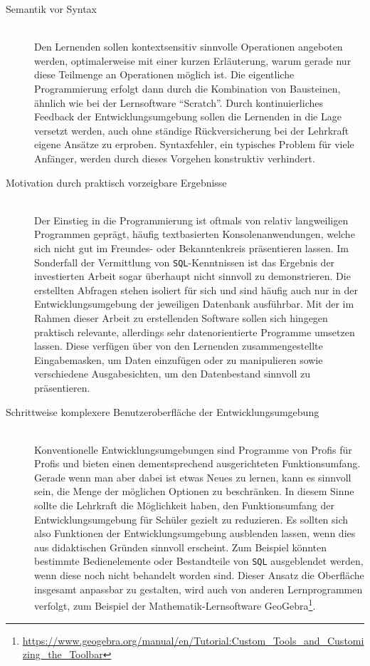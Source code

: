 \begin{description}
\item[Semantik vor Syntax] \label{principle:semantics}\hfill\\
  Den Lernenden sollen kontextsensitiv sinnvolle Operationen angeboten werden, optimalerweise mit einer kurzen Erläuterung, warum gerade nur diese Teilmenge an Operationen möglich ist. Die eigentliche Programmierung erfolgt dann durch die Kombination von Bausteinen, ähnlich wie bei der Lernsoftware "`Scratch"'. Durch kontinuierliches Feedback der Entwicklungsumgebung sollen die Lernenden in die Lage versetzt werden, auch ohne ständige Rückversicherung bei der Lehrkraft eigene Ansätze zu erproben. Syntaxfehler, ein typisches Problem für viele Anfänger, werden durch dieses Vorgehen konstruktiv verhindert.
\item[Motivation durch praktisch vorzeigbare Ergebnisse]\hfill\\
  Der Einstieg in die Programmierung ist oftmals von relativ langweiligen Programmen geprägt, häufig textbasierten Konsolenanwendungen, welche sich nicht gut im Freundes- oder Bekanntenkreis präsentieren lassen. Im Sonderfall der Vermittlung von \texttt{SQL}-Kenntnissen ist das Ergebnis der investierten Arbeit sogar überhaupt nicht sinnvoll zu demonstrieren. Die erstellten Abfragen stehen isoliert für sich und sind häufig auch nur in der Entwicklungsumgebung der jeweiligen Datenbank ausführbar. Mit der im Rahmen dieser Arbeit zu erstellenden Software sollen sich hingegen praktisch relevante, allerdings sehr datenorientierte Programme umsetzen lassen. Diese verfügen über von den Lernenden zusammengestellte Eingabemasken, um Daten einzufügen oder zu manipulieren sowie verschiedene Ausgabesichten, um den Datenbestand sinnvoll zu präsentieren.
\item[Schrittweise komplexere Benutzeroberfläche der Entwicklungsumgebung] \hfill \\
  Konventionelle Entwicklungsumgebungen sind Programme von Profis für Profis und bieten einen dementsprechend ausgerichteten Funktionsumfang. Gerade wenn man aber dabei ist etwas Neues zu lernen, kann es sinnvoll sein, die Menge der möglichen Optionen zu beschränken. In diesem Sinne sollte die Lehrkraft die Möglichkeit haben, den Funktionsumfang der Entwicklungsumgebung für Schüler gezielt zu reduzieren. Es sollten sich also Funktionen der Entwicklungsumgebung ausblenden lassen, wenn dies aus didaktischen Gründen sinnvoll erscheint. Zum Beispiel könnten bestimmte Bedienelemente oder Bestandteile von \texttt{SQL} ausgeblendet werden, wenn diese noch nicht behandelt worden sind. Dieser Ansatz die Oberfläche insgesamt anpassbar zu gestalten, wird auch von anderen Lernprogrammen verfolgt, zum Beispiel der Mathematik-Lernsoftware GeoGebra\footnote{\url{https://www.geogebra.org/manual/en/Tutorial:Custom\_Tools\_and\_Customizing\_the\_Toolbar}}.

\end{description}

